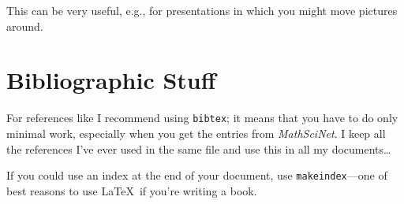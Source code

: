 \vspace{.5in}
\noindent
This can be very useful, e.g., for presentations in which you might move pictures around.


\section{Bibliographic Stuff}

For references like \cite[Section 2]{athanasiadismagic} I recommend using {\tt bibtex}; it means that you have to do only minimal work, especially when you get the entries
from \emph{MathSciNet}. I keep all the references I've ever used in the same file and use this in all my documents\dots

If you could use an index at the end of your document, use {\tt makeindex}---one of best reasons to use \LaTeX \ if you're writing a book.










